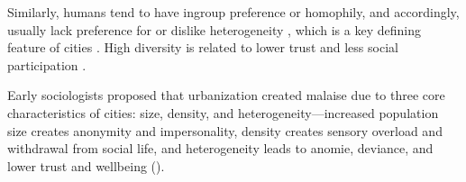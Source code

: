 \documentclass[11pt, letterpaper]{article}
\begin{document}
\begin{spacing}{1.4}


Similarly, humans tend to have ingroup preference or homophily, and
accordingly, usually lack preference for or dislike heterogeneity
\citep{smith14,mcpherson01,bleidorn16,putnam07}, which is a key defining feature
of cities \citep{wirth38,amin06,thrift05}. High diversity is related to lower trust and less social participation \citep{alesina99,alesina00,luttmer01,alesina02,rodriguez2019does}. %


Early sociologists  
 proposed that urbanization created malaise due to three core characteristics of cities: size, density, and heterogeneity---increased population size creates anonymity and
 impersonality, density creates sensory overload and withdrawal from social
 life, and heterogeneity leads to anomie, deviance, and lower trust and wellbeing (\citet{park84,
   simmel03, tonnies57, wirth38,putnam07,aok_brfss_segregation15,herbst14,postmes02,vogt07,smelser99}).
%






\end{spacing}
\end{document}
